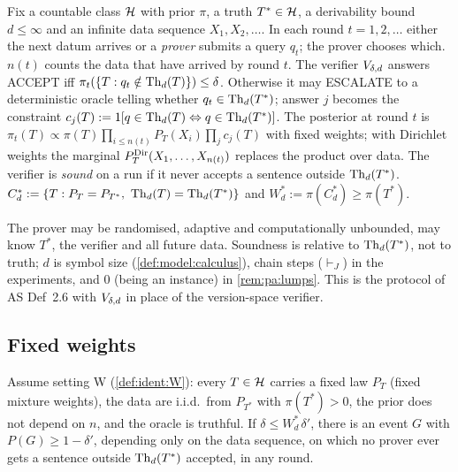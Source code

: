 \begin{definition}\label{def:sound:protocol}
Fix a countable class $\mathcal{H}$ with prior $\pi$, a truth $T^*\in\mathcal{H}$, a derivability bound $d\le\infty$ and an infinite data sequence $X_1,X_2,\dots$. In each round $t=1,2,\dots$ either the next datum arrives or a \emph{prover} submits a query $q_t$; the prover chooses which. $n(t)$ counts the data that have arrived by round $t$. The verifier $V_{\delta,d}$ answers \textsf{ACCEPT} iff $\pi_t(\{T:q_t\notin\mathrm{Th}_d(T)\})\le\delta$. Otherwise it may \textsf{ESCALATE} to a deterministic oracle telling whether $q_t\in\mathrm{Th}_d(T^*)$; answer $j$ becomes the constraint $c_j(T):=1[q\in\mathrm{Th}_d(T)\Leftrightarrow q\in\mathrm{Th}_d(T^*)]$. The posterior at round $t$ is $\pi_t(T)\propto\pi(T)\prod_{i\le n(t)}P_T(X_i)\prod_jc_j(T)$ with fixed weights; with Dirichlet weights the marginal $P^{\mathrm{Dir}}_{T}(X_1,\dots,X_{n(t)})$ replaces the product over data. The verifier is \emph{sound} on a run if it never accepts a sentence outside $\mathrm{Th}_d(T^*)$. $C^*_d:=\{T:P_T=P_{T^*},\ \Th_d(T)=\Th_d(T^*)\}$ and $W^*_d:=\pi(C^*_d)\ge\pi(T^*)$.
\end{definition}

The prover may be randomised, adaptive and computationally unbounded, may know $T^*$, the verifier and all future data. Soundness is relative to $\mathrm{Th}_d(T^*)$, not to truth; $d$ is symbol size (\cref{def:model:calculus}), chain steps ($\vdash_J$) in the experiments, and $0$ (being an instance) in \cref{rem:pa:lumps}. This is the protocol of AS Def~2.6 with $V_{\delta,d}$ in place of the version-space verifier.

\subsection{Fixed weights}\label{sec:sound:fixed}

\begin{theorem}\label{thm:sound:fixed}
Assume setting W (\cref{def:ident:W}): every $T\in\mathcal{H}$ carries a fixed law $P_T$ (fixed mixture weights), the data are i.i.d.\ from $P_{T^*}$ with $\pi(T^*)>0$, the prior does not depend on $n$, and the oracle is truthful. If $\delta\le W^*_d\,\delta'$, there is an event $G$ with $P(G)\ge1-\delta'$, depending only on the data sequence, on which no prover ever gets a sentence outside $\mathrm{Th}_d(T^*)$ accepted, in any round.
\end{theorem}

